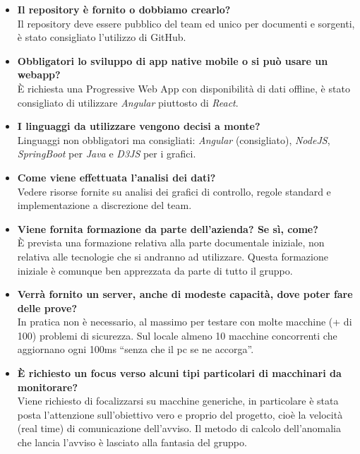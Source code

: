 \documentclass{classes/base}
\begin{document}
    \begin{itemize}
        \item  \textbf{Il repository è fornito o dobbiamo crearlo?}
        \\Il repository deve essere pubblico del team ed unico per documenti e sorgenti, è stato consigliato l'utilizzo di GitHub.
        \item  \textbf{Obbligatori lo sviluppo di app native mobile o si può usare un webapp?}
        \\È richiesta una Progressive Web App con disponibilità di dati offline, è stato consigliato di utilizzare \textit{Angular} piuttosto di \textit{React}.
        \item  \textbf{I linguaggi da utilizzare vengono decisi a monte?} 
        \\Linguaggi non obbligatori ma consigliati: \textit{Angular} (consigliato), \textit{NodeJS}, \textit{SpringBoot} per \textit{Java} e \textit{D3JS} per i grafici.
        \item  \textbf{Come viene effettuata l'analisi dei dati?}
        \\Vedere risorse fornite su analisi dei grafici di controllo, regole standard e implementazione a discrezione del team.
        \item  \textbf{Viene fornita formazione da parte dell'azienda? Se sì, come?}
        \\È prevista una formazione relativa alla parte documentale iniziale, non relativa alle tecnologie che si andranno ad utilizzare. Questa formazione iniziale è comunque ben apprezzata da parte di tutto il gruppo.
        \item  \textbf{Verrà fornito un server, anche di modeste capacità, dove poter fare delle prove?}
        \\In pratica non è necessario, al massimo per testare con molte macchine (+ di 100) problemi di sicurezza. Sul locale almeno 10 macchine concorrenti che aggiornano ogni 100ms “senza che il pc se ne accorga”.
        \item  \textbf{È richiesto un focus verso alcuni tipi particolari di macchinari da monitorare?}
        \\Viene richiesto di focalizzarsi su macchine generiche, in particolare è stata posta l'attenzione sull'obiettivo vero e proprio del progetto, cioè la velocità (real time) di comunicazione dell'avviso. Il metodo di calcolo dell'anomalia che lancia l'avviso è lasciato alla fantasia del gruppo.
    \end{itemize}
\end{document}
